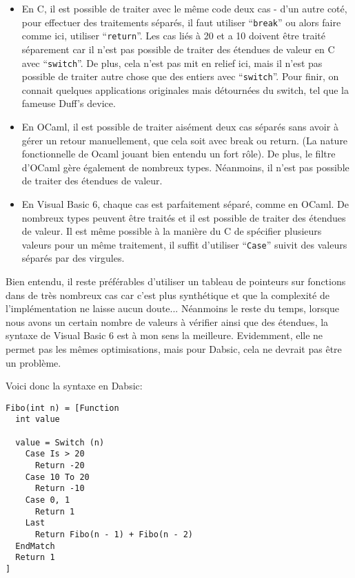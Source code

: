 \documentclass[a5paper, 12pt]{book}
\begin{document}
\begin{itemize}
  \item En C, il est possible de traiter
    avec le même code deux cas - d'un autre coté, pour
    effectuer des traitements séparés, il faut utiliser
    ``\verb!break!'' ou alors faire comme ici, utiliser ``\verb!return!''.
    Les cas liés à 20 et a 10 doivent être traité séparement
    car il n'est pas possible de traiter des étendues de valeur
    en C avec ``\verb!switch!''.
    De plus, cela n'est pas mit en relief ici, mais il
    n'est pas possible de traiter autre chose que des
    entiers avec ``\verb!switch!''.
    Pour finir, on connait quelques applications originales
    mais détournées du switch, tel que la fameuse Duff's device.
    
  \item En OCaml, il est possible de traiter aisément
    deux cas séparés sans avoir à gérer un retour manuellement,
    que cela soit avec break ou return. (La nature fonctionnelle
    de Ocaml jouant bien entendu un fort rôle).
    De plus, le filtre d'OCaml gère également de nombreux
    types.
    Néanmoins, il n'est pas possible de traiter des
    étendues de valeur.

  \item En Visual Basic 6, chaque cas est parfaitement
    séparé, comme en OCaml. De nombreux types peuvent
    être traités et il est possible de traiter des
    étendues de valeur.
    Il est même possible à la manière du C de spécifier
    plusieurs valeurs pour un même traitement, il suffit
    d'utiliser ``\verb!Case!'' suivit des valeurs séparés par
    des virgules.
\end{itemize}

Bien entendu, il reste préférables d'utiliser un tableau de
pointeurs sur fonctions dans de très nombreux cas car c'est
plus synthétique et que la complexité de l'implémentation
ne laisse aucun doute... Néanmoins le reste du temps, lorsque
nous avons un certain nombre de valeurs à vérifier ainsi
que des étendues, la syntaxe de Visual Basic 6 est à mon
sens la meilleure. Evidemment, elle ne permet pas les mêmes
optimisations, mais pour Dabsic, cela ne devrait pas être
un problème.

Voici donc la syntaxe en Dabsic:\\

\begin{verbatim}
Fibo(int n) = [Function
  int value

  value = Switch (n)
    Case Is > 20
      Return -20
    Case 10 To 20
      Return -10
    Case 0, 1
      Return 1
    Last
      Return Fibo(n - 1) + Fibo(n - 2)
  EndMatch
  Return 1
]
\end{verbatim}
\end{document}
